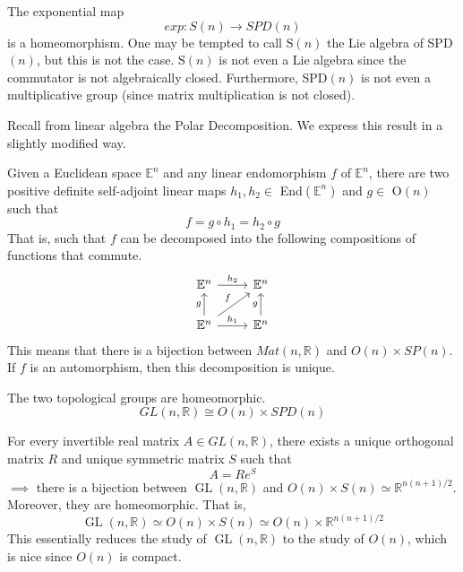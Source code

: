 \documentclass{article}
\DeclareMathOperator{\GL}{GL}
\begin{document}
    \begin{lemma}
    The exponential map 
    \[exp: S(n) \longrightarrow SPD(n)\]
    is a homeomorphism. One may be tempted to call S$(n)$ the Lie algebra of SPD$(n)$, but this is not the case. S$(n)$ is not even a Lie algebra since the commutator is not algebraically closed. Furthermore, SPD$(n)$ is not even a multiplicative group (since matrix multiplication is not closed). 
    \end{lemma}

    Recall from linear algebra the Polar Decomposition. We express this result in a slightly modified way. 

    \begin{theorem}
    Given a Euclidean space $\mathbb{E}^n$ and any linear endomorphism $f$ of $\mathbb{E}^n$, there are two positive definite self-adjoint linear maps $h_1, h_2 \in$ End$(\mathbb{E}^n)$ and $g \in$ O$(n)$ such that
    \[f = g \circ h_1 = h_2 \circ g\]
    That is, such that $f$ can be decomposed into the following compositions of functions that commute. 
    \[\begin{tikzcd}
    \mathbb{E}^n \arrow{r}{h_2} & \mathbb{E}^n \\
    \mathbb{E}^n \arrow{u}{g} \arrow{ur}{f} \arrow{r}{h_1} & \mathbb{E}^n \arrow{u}{g}
    \end{tikzcd}\]
    This means that there is a bijection between $Mat(n, \mathbb{R})$ and $O(n) \times SP(n)$. If $f$ is an automorphism, then this decomposition is unique. 
    \end{theorem}

    \begin{corollary}
    The two topological groups are homeomorphic. 
    \[GL(n, \mathbb{R}) \cong O(n) \times SPD(n)\]
    \end{corollary}

    \begin{corollary}
    For every invertible real matrix $A \in GL(n, \mathbb{R})$, there exists a unique orthogonal matrix $R$ and unique symmetric matrix $S$ such that
    \[A = R e^S\]
    $\implies$ there is a bijection between $\GL(n, \mathbb{R})$ and $O(n) \times S(n) \simeq \mathbb{R}^{n(n+1)/2}$. Moreover, they are homeomorphic. That is, 
    \[\GL(n, \mathbb{R}) \simeq O(n) \times S(n) \simeq O(n) \times \mathbb{R}^{n(n+1)/2}\]
    This essentially reduces the study of $\GL(n, \mathbb{R})$ to the study of $O(n)$, which is nice since $O(n)$ is compact. 
    \end{corollary}
\end{document}
